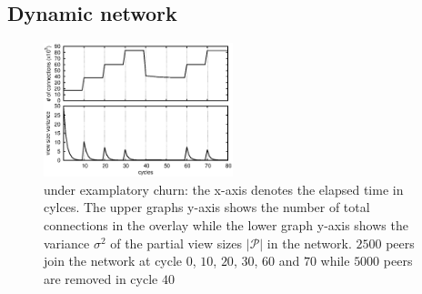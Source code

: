 \subsection{Dynamic network}

\begin{figure}
  \centering
  \includegraphics[width=0.49\textwidth]{img/churn.eps}
  \caption{\label{fig:churn}\SPRAY{} under examplatory churn: the x-axis denotes
      the elapsed time in cylces. The upper graphs y-axis shows the
      number of total connections in the overlay while the lower graph y-axis shows
      the variance $\sigma^2$ of the partial view sizes $|\mathcal{P}|$ in the network.
      $2500$ peers join the network at cycle $0$, $10$, $20$, $30$, $60$ and $70$
      while $5000$ peers are removed in cycle $40$
  }
\end{figure}

